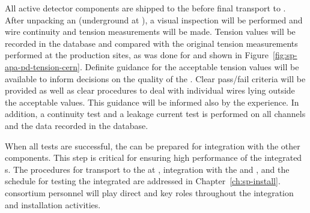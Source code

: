 All active detector components are shipped to the  before final transport to . 
After unpacking an  (underground at ), a visual inspection will be performed and wire continuity and tension measurements will be made. 
Tension values will be recorded in the database and compared with the original tension measurements performed at the production sites, as was done for  and shown in Figure~\ref{fig:sp-apa-pd-tension-cern}. Definite guidance for the acceptable tension values will be available to inform decisions on the quality of the . Clear pass/fail criteria %
will be provided as well as clear procedures to deal with individual wires lying outside the acceptable values. %
This guidance will be informed also by the  experience. %
In addition, a continuity test and a leakage current test is performed on all channels and the data recorded in the database. 


When all tests are successful, 
the  can be prepared 
for integration with the other components. %
This step is critical for ensuring high performance of the integrated s. The procedures for  transport to the  at , integration with the  and , and the schedule for testing the integrated  are addressed in %
Chapter~\ref{ch:sp-install}.  consortium personnel will play direct and key roles throughout the integration and installation activities.  



